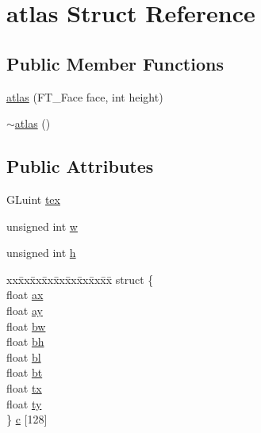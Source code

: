 \hypertarget{structatlas}{}\section{atlas Struct Reference}
\label{structatlas}
\subsection*{Public Member Functions}
\begin{DoxyCompactItemize}
\item 
\hyperlink{structatlas_acff7316647fa402c573edcf150eea8f6}{atlas} (F\+T\+\_\+\+Face face, int height)
\item 
\hyperlink{structatlas_acdf57e34cdfdf4ebb8c6642138db3783}{$\sim$atlas} ()
\end{DoxyCompactItemize}
\subsection*{Public Attributes}
\begin{DoxyCompactItemize}
\item 
G\+Luint \hyperlink{structatlas_a404771e1eaa3c2566b9edc706e11348d}{tex}
\item 
unsigned int \hyperlink{structatlas_a9c95ce93a23b235ef4dc53bac9752b07}{w}
\item 
unsigned int \hyperlink{structatlas_ad780d19f50dcc0435b7fd9493326599d}{h}
\item 
\begin{tabbing}
xx\=xx\=xx\=xx\=xx\=xx\=xx\=xx\=xx\=\kill
struct \{\\
\>float \hyperlink{structatlas_a1c10daf375be9d49b1797a45c1afd0bc}{ax}\\
\>float \hyperlink{structatlas_a5bc5678efa5b336eb147d01546c382a1}{ay}\\
\>float \hyperlink{structatlas_a304954b04272b5ff2758ae8504dc5858}{bw}\\
\>float \hyperlink{structatlas_aade1078df1660281c69cc7c94bdd498a}{bh}\\
\>float \hyperlink{structatlas_a131ed5aac43de689ed8578ec9ce26788}{bl}\\
\>float \hyperlink{structatlas_a9d0c808989b3428420da705a40905068}{bt}\\
\>float \hyperlink{structatlas_ada99d3ec259f84b4d8bb1a8c46788191}{tx}\\
\>float \hyperlink{structatlas_a758aa30e6372d85fd7562492bb5510cd}{ty}\\
\} \hyperlink{structatlas_a010cf923db6de0a7a4923d7f6dd2175e}{c} \mbox{[}128\mbox{]}\\

\end{tabbing}\end{DoxyCompactItemize}


